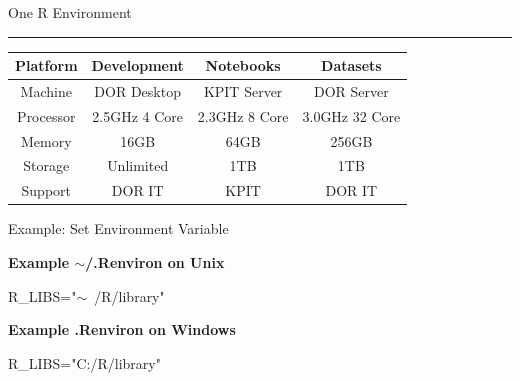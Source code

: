 \documentclass{beamer}
\begin{document}
\begin{frame}{One R Environment}

\begin{figure}[h!]
\end{figure}
\begin{center}
\rule{4cm}{0.6pt}
\end{center}


\footnotesize
\begin{center}
\begin{tabular}{||c | c | c | c||}
\hline\hline
\textbf{Platform} & \textbf{Development} & \textbf{Notebooks} & \textbf{Datasets} \\
\hline
Machine & DOR Desktop & KPIT Server & DOR Server \\
\hline
Processor & 2.5GHz 4 Core &  2.3GHz 8 Core & 3.0GHz 32 Core \\ 
\hline
Memory & 16GB & 64GB & 256GB\\
\hline
Storage & Unlimited & 1TB & 1TB \\
\hline
Support & DOR IT & KPIT & DOR IT \\
\hline\hline
\end{tabular}
\end{center}

\end{frame}


\begin{frame}{Example: Set Environment Variable}
\bigskip
\begin{center}\textbf{ Example $\sim$/.Renviron on Unix\\} \end{center}
  R\_LIBS="$\sim$~/R/library"\\
\bigskip	
\begin{center}\textbf{ Example .Renviron on Windows\\} \end{center}
  R\_LIBS="C:/R/library"\\
\end{frame}
\end{document}
